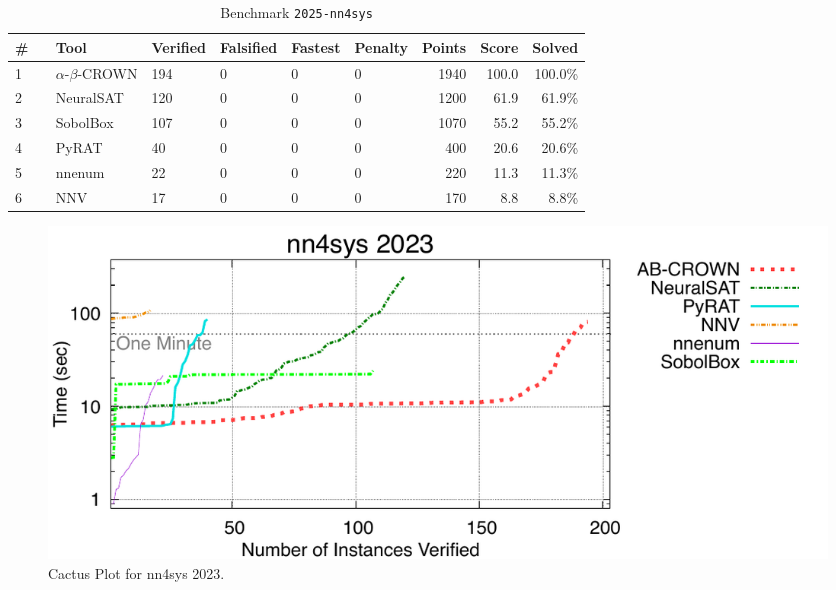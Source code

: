 \begin{table}[h]
\begin{center}
\caption{Benchmark \texttt{2025-nn4sys}} \label{tab:cat_2025_nn4sys}
{\setlength{\tabcolsep}{2pt}
\begin{tabular}[h]{@{}llllllrrr@{}}
\toprule
\textbf{\# ~} & \textbf{Tool} & \textbf{Verified} & \textbf{Falsified} & \textbf{Fastest} & \textbf{Penalty} & \textbf{Points} & \textbf{Score} & \textbf{Solved}\\
\midrule
1 & $\alpha$-$\beta$-CROWN & 194 & 0 & 0 & 0 & 1940 & 100.0 & 100.0\% \\
2 & NeuralSAT & 120 & 0 & 0 & 0 & 1200 & 61.9 & 61.9\% \\
3 & SobolBox & 107 & 0 & 0 & 0 & 1070 & 55.2 & 55.2\% \\
4 & PyRAT & 40 & 0 & 0 & 0 & 400 & 20.6 & 20.6\% \\
5 & nnenum & 22 & 0 & 0 & 0 & 220 & 11.3 & 11.3\% \\
6 & NNV & 17 & 0 & 0 & 0 & 170 & 8.8 & 8.8\% \\
\bottomrule
\end{tabular}
}
\end{center}
\end{table}



\begin{figure}[h]
\centerline{\includegraphics[width=\textwidth]{cactus/2025_nn4sys.pdf}}
\caption{Cactus Plot for nn4sys 2023.}
\label{fig:quantPic}
\end{figure}


\clearpage


